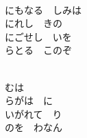 \documentclass[10pt,b5j]{tarticle} %
\begin{document}
\begin{enumerate}
\begin{minipage}[c]{\blocksize}
    \end{minipage}
    \begin{minipage}[c]{\blocksize}
        
        \vspace{\linespace}
        \item~\\
        にもなる　しみは\\
        にれし　きの\\
        にごせし　いを\\
        らとる　このぞ
        
    \end{minipage}
    \begin{minipage}[c]{\blocksize}
        
        \vspace{\linespace}
        \item~\\
        むは　\\
        らがは　に\\
        いがれて　り\\
        のを　わなん
    
    \end{minipage}
\end{enumerate} %
\end{document}
